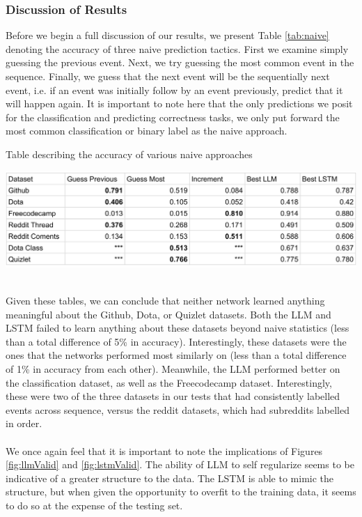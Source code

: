 \subsubsection{Discussion of Results}
Before we begin a full discussion of our results, we present Table \ref{tab:naive} denoting the accuracy of three naive prediction tactics. First we examine simply guessing the previous event. Next, we try guessing the most common event in the sequence. Finally, we guess that the next event will be the sequentially next event, i.e. if an event was initially follow by an event previously, predict that it will happen again. It is important to note here that the only predictions we posit for the classification and predicting correctness tasks, we only put forward the most common classification or binary label as the naive approach.\\
\begin{table}
    \caption[Naive Predictions]{Table describing the accuracy of various naive approaches}
    \label{tab:naive}
    \begin{center}
	\includegraphics[width=\textwidth]{figures/Naive_Predicts.pdf}
    \end{center}
\end{table}
\\ Given these tables, we can conclude that neither network learned anything meaningful about the Github, Dota, or Quizlet datasets. Both the LLM and LSTM failed to learn anything about these datasets beyond naive statistics (less than a total difference of 5\% in accuracy). Interestingly, these datasets were the ones that the networks performed most similarly on (less than a total difference of 1\% in accuracy from each other). Meanwhile, the LLM performed better on the classification dataset, as well as the Freecodecamp dataset. Interestingly, these were two of the three datasets in our tests that had consistently labelled events across sequence, versus the reddit datasets, which had subreddits labelled in order.
\\\\ We once again feel that it is important to note the implications of Figures \ref{fig:llmValid} and \ref{fig:lstmValid}. The ability of LLM to self regularize seems to be indicative of a greater structure to the data. The LSTM is able to mimic the structure, but when given the opportunity to overfit to the training data, it seems to do so at the expense of the testing set. 
